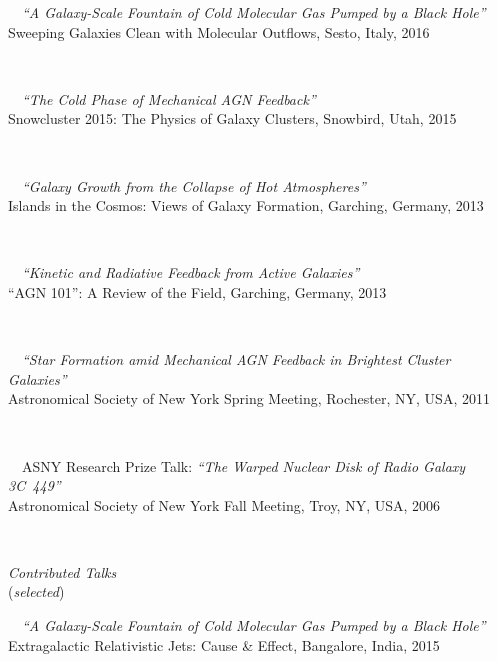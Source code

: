 \documentclass[11pt]{article}
\begin{document}
\hspace{42mm} \parbox{5.15in}{
\textbullet~~\textit{``A Galaxy-Scale Fountain of Cold Molecular Gas Pumped by a Black Hole''}\\ Sweeping Galaxies Clean with Molecular Outflows, Sesto, Italy, 2016}\\



\hspace{42mm} \parbox{5.15in}{
\textbullet~~\textit{``The Cold Phase of Mechanical AGN Feedback''}\\ Snowcluster 2015: The Physics of Galaxy Clusters, Snowbird, Utah, 2015}\\


\hspace{42mm} \parbox{5.15in}{
\textbullet~~\textit{``Galaxy Growth from the Collapse of Hot Atmospheres''}\\ Islands in the Cosmos: Views of Galaxy Formation, Garching, Germany, 2013}\\

\hspace{42mm} \parbox{5.15in}{
\textbullet~~\textit{``Kinetic and Radiative Feedback from Active Galaxies''} \\ ``AGN 101'': A Review of the Field, Garching, Germany, 2013}\\


\hspace{42mm} \parbox{5.15in}{
\textbullet~~\textit{``Star Formation amid Mechanical AGN Feedback in Brightest Cluster Galaxies''}\\ Astronomical Society of New York Spring Meeting, Rochester, NY, USA, 2011}\\


\hspace{42mm} \parbox{5.15in}{
\textbullet~~ASNY Research Prize Talk: \textit{``The Warped Nuclear Disk of Radio Galaxy 3C~449''}\\ Astronomical Society of New York Fall Meeting, Troy, NY, USA, 2006}\\




\vspace{4mm}



\hspace{2.5mm} \parbox{1.5in}{\textit{Contributed Talks}\\ (\textit{selected})} \parbox{5.15in}{
\textbullet~~\textit{``A Galaxy-Scale Fountain of Cold Molecular Gas Pumped by a Black Hole''} \\
Extragalactic Relativistic Jets: Cause \& Effect, Bangalore, India, 2015}\\
\end{document}
